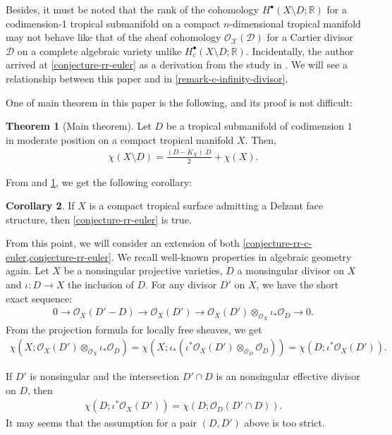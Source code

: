 \documentclass[a4paper,dvipdfmx,reqno,12pt]{amsart}
\theoremstyle{definition}
\newtheorem{theorem}{Theorem}[section]
\newtheorem{corollary}[theorem]{Corollary}
\numberwithin{equation}{section}
\begin{document}
Besides, it must be noted that
the rank of the cohomology 
$H^{\bullet}(X\setminus D;\mathbb{R})$ 
for a codimension-1 tropical submanifold
on a compact $n$-dimensional tropical manifold
may not behave like that of
the sheaf cohomology 
$\mathcal{O}_{\mathcal{X}}(\mathcal{D})$
for a Cartier divisor $\mathcal{D}$ 
on a complete algebraic variety unlike
$H^{\bullet}_c(X\setminus D;\mathbb{R})$.
Incidentally, the author arrived at
\cref{conjecture-rr-euler} as
a derivation from the study in
\cite{tsutsui2023graded}. 
We will see a relationship between 
this paper and \cite{tsutsui2023graded}
in \cref{remark-c-infinity-divisor}.

One of main theorem in this paper
is the following, and its proof is not difficult:
\begin{theorem}[{Main theorem}]
\label{theorem-rr-euler-surface}
Let $D$ be a tropical submanifold of codimension $1$
in moderate position on a compact tropical manifold
$X$. Then,
\begin{align}
\chi(X\setminus D)=\frac{(D-K_X). D}{2}+
\chi(X).
\end{align}
\end{theorem}
From \cite[Theorem 6.3]{demedrano2023chern}
and \cref{theorem-rr-euler-surface}, we get
the following corollary:
\begin{corollary}
\label{corollary-ds-euler-rr}
If $X$ is a compact tropical surface admitting 
a Delzant face structure, then
\cref{conjecture-rr-euler} is true.
\end{corollary}
From this point, 
we will consider an extension of both
\cref{conjecture-rr-c-euler,conjecture-rr-euler}.
We recall well-known properties in algebraic geometry again.
Let $X$ be a nonsingular projective varieties,
$D$ a monsingular divisor on $X$ and
$\iota\colon D\to X$ the inclusion of $D$.
For any divisor $D'$ on $X$, we have
the short exact sequence:
\begin{align}
0 \to \mathcal{O}_X(D'-D)\to \mathcal{O}_X(D')
\to \mathcal{O}_X(D')
\otimes_{\mathcal{O}_X} \iota_*\mathcal{O}_D \to 0. 
\end{align}
From the projection formula for locally free sheaves,
we get 
\begin{align}
\chi(X;\mathcal{O}_X(D')\otimes_{\mathcal{O}_X} \iota_*\mathcal{O}_D)
=\chi(X;\iota_*(\iota^{*}\mathcal{O}_X(D')\otimes_{\mathcal{O}_D} \mathcal{O}_D))
=\chi(D;\iota^{*}\mathcal{O}_X(D')).
\end{align}

If $D'$ is nonsingular and the intersection
$D'\cap D$ is an nonsingular effective divisor
on $D$, then
\begin{align}
\chi(D;\iota^{*}\mathcal{O}_X(D'))=\chi(D;\mathcal{O}_D(D'\cap D)).
\end{align}
It may seems that 
the assumption for a pair $(D,D')$ above is
too strict.
\end{document}

